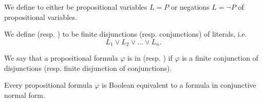 \begin{definition}\label{def:conjunctive_normal_form}
  We define  to either be propositional variables \( L = P \) or negations \( L = \neg P \) of propositional variables.

  We define  (resp. ) to be finite disjunctions (resp. conjunctions) of literals, i.e.
  \begin{equation*}
    L_1 \lor L_2 \lor \ldots \lor L_n.
  \end{equation*}

  We say that a propositional formula \( \varphi \) is in  (resp. ) if \( \varphi \) is a finite conjunction of disjunctions (resp. finite disjunction of conjunctions).
\end{definition}

\begin{proposition}\label{thm:conjunctive_normal_form_reduction}
  Every propositional formula \( \varphi \) is Boolean equivalent to a formula in conjunctive normal form.
\end{proposition}

